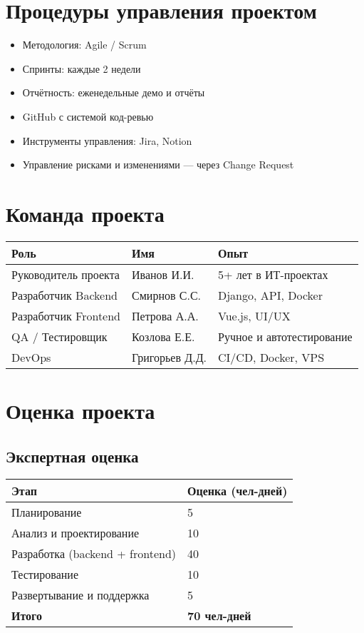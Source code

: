 \documentclass[14pt, russian]{matmex-diploma-custom}
\begin{document}
\section{Процедуры управления проектом}

\begin{itemize}[noitemsep]
    \item Методология: Agile / Scrum
    \item Спринты: каждые 2 недели
    \item Отчётность: еженедельные демо и отчёты
    \item GitHub с системой код-ревью
    \item Инструменты управления: Jira, Notion
    \item Управление рисками и изменениями — через Change Request
\end{itemize}


\section{Команда проекта}

\begin{longtable}{|p{5cm}|p{5cm}|p{4cm}|}
    \hline
    \textbf{Роль} & \textbf{Имя} & \textbf{Опыт} \\
    \hline
    Руководитель проекта & Иванов И.И. & 5+ лет в ИТ-проектах \\
    \hline
    Разработчик Backend & Смирнов С.С. & Django, API, Docker \\
    \hline
    Разработчик Frontend & Петрова А.А. & Vue.js, UI/UX \\
    \hline
    QA / Тестировщик & Козлова Е.Е. & Ручное и автотестирование \\
    \hline
    DevOps & Григорьев Д.Д. & CI/CD, Docker, VPS \\
    \hline
    \end{longtable}


\section{Оценка проекта}

\subsection*{Экспертная оценка}

\begin{tabular}{|p{10cm}|p{4cm}|}
\hline
\textbf{Этап} & \textbf{Оценка (чел-дней)} \\
\hline
Планирование & 5 \\
\hline
Анализ и проектирование & 10 \\
\hline
Разработка (backend + frontend) & 40 \\
\hline
Тестирование & 10 \\
\hline
Развертывание и поддержка & 5 \\
\hline
\textbf{Итого} & \textbf{70 чел-дней} \\
\hline
\end{tabular}
\end{document}
